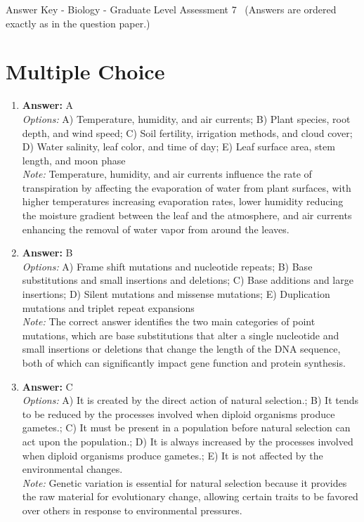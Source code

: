 \documentclass[12pt]{article}
\begin{document}
\begin{center}
Answer Key - Biology - Graduate Level Assessment 7 \
\small (Answers are ordered exactly as in the question paper.)
\end{center}

\section*{Multiple Choice}
\begin{enumerate}[label=\arabic*.]
\item \textbf{Answer:} A
\\ \textit{Options:} A) Temperature, humidity, and air currents; B) Plant species, root depth, and wind speed; C) Soil fertility, irrigation methods, and cloud cover; D) Water salinity, leaf color, and time of day; E) Leaf surface area, stem length, and moon phase
\\ \textit{Note:} Temperature, humidity, and air currents influence the rate of transpiration by affecting the evaporation of water from plant surfaces, with higher temperatures increasing evaporation rates, lower humidity reducing the moisture gradient between the leaf and the atmosphere, and air currents enhancing the removal of water vapor from around the leaves.
\item \textbf{Answer:} B
\\ \textit{Options:} A) Frame shift mutations and nucleotide repeats; B) Base substitutions and small insertions and deletions; C) Base additions and large insertions; D) Silent mutations and missense mutations; E) Duplication mutations and triplet repeat expansions
\\ \textit{Note:} The correct answer identifies the two main categories of point mutations, which are base substitutions that alter a single nucleotide and small insertions or deletions that change the length of the DNA sequence, both of which can significantly impact gene function and protein synthesis.
\item \textbf{Answer:} C
\\ \textit{Options:} A) It is created by the direct action of natural selection.; B) It tends to be reduced by the processes involved when diploid organisms produce gametes.; C) It must be present in a population before natural selection can act upon the population.; D) It is always increased by the processes involved when diploid organisms produce gametes.; E) It is not affected by the environmental changes.
\\ \textit{Note:} Genetic variation is essential for natural selection because it provides the raw material for evolutionary change, allowing certain traits to be favored over others in response to environmental pressures.

\end{enumerate}
\end{document}
